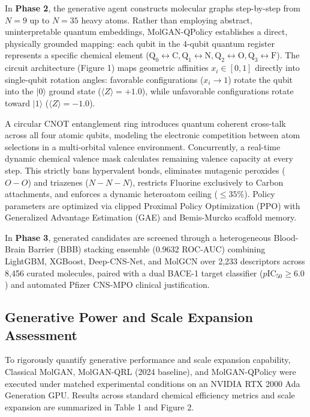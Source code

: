 \documentclass[10pt,a4paper]{article}
\begin{document}
In \textbf{Phase 2}, the generative agent constructs molecular graphs step-by-step from $N=9$ up to $N=35$ heavy atoms. Rather than employing abstract, uninterpretable quantum embeddings, MolGAN-QPolicy establishes a direct, physically grounded mapping: each qubit in the 4-qubit quantum register represents a specific chemical element ($\text{Q}_0 \leftrightarrow \text{C}, \text{Q}_1 \leftrightarrow \text{N}, \text{Q}_2 \leftrightarrow \text{O}, \text{Q}_3 \leftrightarrow \text{F}$). The circuit architecture (Figure 1) maps geometric affinities $x_i \in [0, 1]$ directly into single-qubit rotation angles: favorable configurations ($x_i \to 1$) rotate the qubit into the $|0\rangle$ ground state ($\langle Z \rangle = +1.0$), while unfavorable configurations rotate toward $|1\rangle$ ($\langle Z \rangle = -1.0$). 

A circular CNOT entanglement ring introduces quantum coherent cross-talk across all four atomic qubits, modeling the electronic competition between atom selections in a multi-orbital valence environment. Concurrently, a real-time dynamic chemical valence mask calculates remaining valence capacity at every step. This strictly bans hypervalent bonds, eliminates mutagenic peroxides ($O-O$) and triazenes ($N-N-N$), restricts Fluorine exclusively to Carbon attachments, and enforces a dynamic heteroatom ceiling ($\le 35\%$). Policy parameters are optimized via clipped Proximal Policy Optimization (PPO) with Generalized Advantage Estimation (GAE) and Bemis-Murcko scaffold memory.

In \textbf{Phase 3}, generated candidates are screened through a heterogeneous Blood-Brain Barrier (BBB) stacking ensemble (0.9632 ROC-AUC) combining LightGBM, XGBoost, Deep-CNS-Net, and MolGCN over 2,233 descriptors across 8,456 curated molecules, paired with a dual BACE-1 target classifier ($p\text{IC}_{50} \ge 6.0$) and automated Pfizer CNS-MPO clinical justification.

\subsection{Generative Power and Scale Expansion Assessment}
To rigorously quantify generative performance and scale expansion capability, Classical MolGAN, MolGAN-QRL (2024 baseline), and MolGAN-QPolicy were executed under matched experimental conditions on an NVIDIA RTX 2000 Ada Generation GPU. Results across standard chemical efficiency metrics and scale expansion are summarized in Table 1 and Figure 2.
\end{document}
